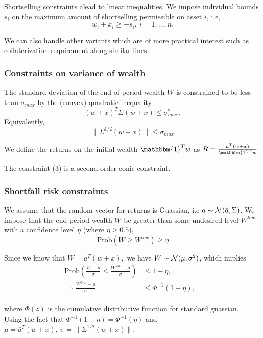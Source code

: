 \documentclass[a4paper]{article}
\begin{document}
Shortselling constraints alead to linear inequalities. We impose 
individual bounds $s_i$ on the maximum amount of shortselling permissible on asset $i$, i.e,
\begin{equation}
w_i + x_i \geq -s_i, \ i = 1,\ldots, n.
\end{equation}

We can also handle other variants which are of more practical interest such as collaterization requirement along similar lines.\cite{2}

\subsubsection{Constraints on variance of wealth}

The standard deviation of the end of period wealth $W$ is constrained to be less than $\sigma_{max}$ by
the (convex) quadratic inequality
$$
(w + x)^T \Sigma (w + x) \leq \sigma_{max}^2,
$$
Equivalently,
\begin{equation}
\|\Sigma^{1/2}(w+x)\| \leq \sigma_{max}
\end{equation}

We define the returns on the initial wealth $\mathbbm{1}^Tw$ as $R =\frac{\bar{a}^T(w+x)}{\mathbbm{1}^Tw}$


The constraint (3) is a second-order conic constraint.
\subsubsection{Shortfall risk constraints}

We assume that the random vector for returns is Guassian, i.e $a \thicksim \mathcal{N}(\bar{a},\Sigma)$. We impose that the end-period wealth $W$ be greater than some undesired level $W^{low}$
with a confidence level $\eta$ (where $\eta \geq 0.5$), 
\[
\text{Prob}(W \geq W^{low}) \geq \eta
\]

Since we know that $W = a^T(w+x),$ we have $W \thicksim \mathcal{N}(\mu,\sigma^2)$, which implies
\begin{align*}
\text{Prob}(\frac{W-\mu}{\sigma} \leq \frac{W^{low}-\mu}{\sigma}) &\leq 1- \eta, & \\
 \Rightarrow \frac{W^{low}-\mu}{\sigma} &\leq \Phi^{-1}(1-\eta),&\\
\end{align*}

where $\Phi(z)$ is the cumulative distributive function for standard guassian.\\[0.2em]
Using the fact that $\Phi^{-1}(1-\eta)= \Phi^{-1}(\eta)$ and $\mu= \bar{a}^T(w+x),\ \sigma=\|\Sigma^{1/2}(w+x) \|$,
\end{document}

